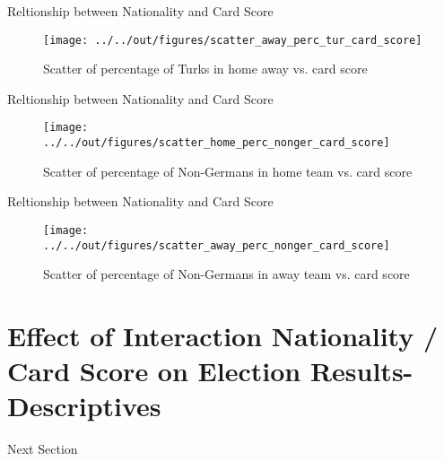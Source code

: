 \documentclass[11pt]{beamer}
\begin{document}
\begin{frame}{Reltionship between Nationality and Card Score}
    \begin{figure}
        \caption{Scatter of percentage of Turks in home away vs. card score}
        \texttt{[image: ../../out/figures/scatter\_away\_perc\_tur\_card\_score]}
    \end{figure}
\end{frame}

\begin{frame}{Reltionship between Nationality and Card Score}
    \begin{figure}
        \caption{Scatter of percentage of Non-Germans in home team vs. card score}
        \texttt{[image: ../../out/figures/scatter\_home\_perc\_nonger\_card\_score]}
    \end{figure}
\end{frame}

\begin{frame}{Reltionship between Nationality and Card Score}
    \begin{figure}
        \caption{Scatter of percentage of Non-Germans in away team vs. card score}
        \texttt{[image: ../../out/figures/scatter\_away\_perc\_nonger\_card\_score]}
    \end{figure}
\end{frame}

\section{Effect of Interaction Nationality / Card Score on Election Results- Descriptives}

\begin{frame}
    Next Section
\end{frame}
\end{document}
